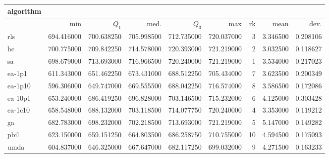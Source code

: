 \begin{tabular}{@{}l*{5}{>{{}}N{3}{2}}>{{}}N{2}{0}N{1}{3}N{1}{3}@{}}
\toprule
{algorithm} &  &  \\
\midrule
& {min} & {$Q_1$} & {med.} & {$Q_3$} & {max} & {rk} & {mean} & {dev.} \\
\midrule
rls & 694.416000 & 700.638250 & 705.998500 & 712.735000 & 720.037000 & 3 & 3.346500 & 0.208106 \\
 hc & {\color{blue}} 700.775000 & 709.842250 & 714.578000 & {\color{blue}} 720.393000 & {\color{blue}} 721.219000 & 2 & 3.032500 & 0.118627 \\
 sa & 698.679000 & {\color{blue}} 713.693000 & {\color{blue}} 716.966500 & 720.240000 & {\color{blue}} 721.219000 & 1 & 3.534000 & 0.217023 \\
 ea-1p1 & 611.343000 & 651.462250 & 673.431000 & 688.512250 & 705.434000 & 7 & 3.623500 & 0.200349 \\
 ea-1p10 & 596.306000 & 649.747000 & 669.555500 & 688.042250 & 716.574000 & 8 & 3.586500 & 0.172086 \\
 ea-10p1 & 653.240000 & 686.419250 & 696.828000 & 703.146500 & 715.232000 & 6 & 4.125000 & 0.303428 \\
 ea-1c10 & 658.548000 & 688.132000 & 703.118500 & 714.077750 & 720.240000 & 4 & 3.353000 & 0.119212 \\
 ga & 682.783000 & 698.232000 & 702.218500 & 713.693000 & {\color{blue}} 721.219000 & 5 & 5.147000 & 0.149282 \\
 pbil & 623.150000 & 659.151250 & 664.803500 & 686.258750 & 710.755000 & 10 & 4.594500 & 0.175093 \\
 umda & 604.837000 & 646.325000 & 667.647000 & 682.117250 & 699.032000 & 9 & 4.271500 & 0.163233 \\
 \bottomrule
\end{tabular}
